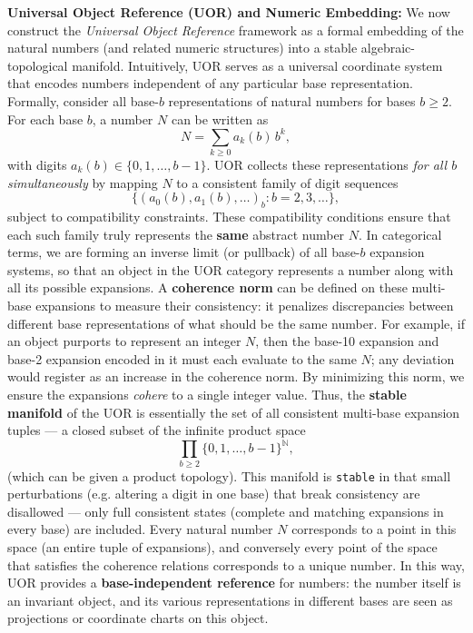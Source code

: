 \documentclass{article}
\begin{document}
\textbf{Universal Object Reference (UOR) and Numeric Embedding:} We now construct the \emph{Universal Object Reference} framework as a formal embedding of the natural numbers (and related numeric structures) into a stable algebraic-topological manifold. Intuitively, UOR serves as a universal coordinate system that encodes numbers independent of any particular base representation. Formally, consider all base-$b$ representations of natural numbers for bases $b\ge 2$. For each base $b$, a number $N$ can be written as
$$
N = \sum_{k\ge0} a_k(b)\, b^k,
$$
with digits $a_k(b)\in\{0,1,\dots,b-1\}$. UOR collects these representations \emph{for all $b$ simultaneously} by mapping $N$ to a consistent family of digit sequences 
$$
\{(a_0(b),a_1(b),\ldots)_b : b=2,3,\dots\},
$$ 
subject to compatibility constraints. These compatibility conditions ensure that each such family truly represents the \textbf{same} abstract number $N$. In categorical terms, we are forming an inverse limit (or pullback) of all base-$b$ expansion systems, so that an object in the UOR category represents a number along with all its possible expansions. A \textbf{coherence norm} can be defined on these multi-base expansions to measure their consistency: it penalizes discrepancies between different base representations of what should be the same number. For example, if an object purports to represent an integer $N$, then the base-10 expansion and base-2 expansion encoded in it must each evaluate to the same $N$; any deviation would register as an increase in the coherence norm. By minimizing this norm, we ensure the expansions \emph{cohere} to a single integer value. Thus, the \textbf{stable manifold} of the UOR is essentially the set of all consistent multi-base expansion tuples --- a closed subset of the infinite product space 
$$
\prod_{b\ge2} \{0,1,\dots,b-1\}^\mathbb{N},
$$ 
(which can be given a product topology). This manifold is \texttt{stable} in that small perturbations (e.g. altering a digit in one base) that break consistency are disallowed --- only full consistent states (complete and matching expansions in every base) are included. Every natural number $N$ corresponds to a point in this space (an entire tuple of expansions), and conversely every point of the space that satisfies the coherence relations corresponds to a unique number. In this way, UOR provides a \textbf{base-independent reference} for numbers: the number itself is an invariant object, and its various representations in different bases are seen as projections or coordinate charts on this object.
\end{document}
